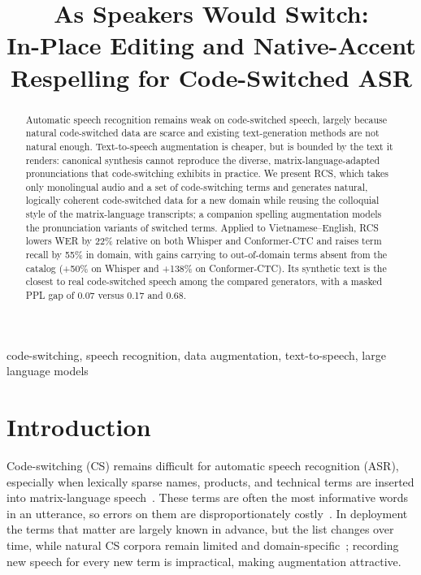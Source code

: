 \documentclass[letterpaper]{article}
\title{As Speakers Would Switch:\\
In-Place Editing and Native-Accent Respelling for Code-Switched ASR}
\begin{document}
\maketitle

\begin{abstract}
Automatic speech recognition remains weak on code-switched speech, largely
because natural code-switched data are scarce and existing text-generation
methods are not natural enough. Text-to-speech augmentation is cheaper, but
is bounded by the text it renders: canonical synthesis cannot reproduce the
diverse, matrix-language-adapted pronunciations that code-switching exhibits
in practice. We present RCS, which takes only monolingual audio and a set of
code-switching terms and generates natural, logically coherent code-switched
data for a new domain while reusing the colloquial style of the
matrix-language transcripts; a companion spelling augmentation models the
pronunciation variants of switched terms. Applied to Vietnamese--English,
RCS lowers WER by 22\% relative on both Whisper and Conformer-CTC and raises
term recall by 55\% in domain, with gains carrying to out-of-domain terms
absent from the catalog (+50\% on Whisper and +138\% on Conformer-CTC).
Its synthetic text is the closest to real code-switched speech among the
compared generators, with a masked PPL gap of 0.07 versus 0.17 and 0.68.
\end{abstract}
\begin{keywords}
code-switching, speech recognition, data augmentation, text-to-speech,
large language models
\end{keywords}

\section{Introduction}
\label{sec:intro}
Code-switching (CS) remains difficult for automatic speech recognition
(ASR), especially when lexically sparse names, products, and technical
terms are inserted into matrix-language
speech~\cite{zhou2026sorry,liu2026lens}. These terms are often the most
informative words in an utterance, so errors on them are
disproportionately costly~\cite{ugan2025pier}. In deployment the terms
that matter are largely known in advance, but the list changes over time,
while natural CS corpora remain limited and
domain-specific~\cite{nguyen2026vimedcss}; recording new speech for every
new term is impractical, making augmentation attractive.
\end{document}
